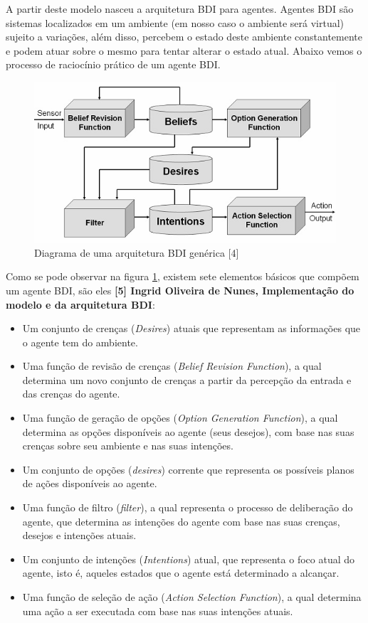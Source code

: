 A partir deste modelo nasceu a arquitetura BDI para agentes. Agentes BDI são sistemas localizados em um ambiente (em nosso caso o ambiente será virtual) sujeito a variações, além disso, percebem o estado deste ambiente constantemente e podem atuar sobre o mesmo para tentar alterar o estado atual.
Abaixo vemos o processo de raciocínio prático de um agente BDI.
 
\begin{figure}
\centering
\includegraphics{figuras/visao_BDI.jpg}
\caption{Diagrama de uma arquitetura BDI genérica [4]}
\label{arquitetura BDI}
\end{figure}

Como se pode observar na figura \ref{arquitetura BDI}, existem sete elementos básicos que compõem um agente BDI, são eles \textbf{[5] Ingrid Oliveira de Nunes, Implementação do modelo e da arquitetura BDI}:
\begin{itemize}
\item Um conjunto de crenças (\textit{Desires}) atuais que representam as informações que o agente tem do ambiente.
\item Uma função de revisão de crenças (\textit{Belief Revision Function}), a qual determina um novo conjunto de crenças a partir da percepção da entrada e das crenças do agente.
\item Uma função de geração de opções (\textit{Option Generation Function}), a qual determina as opções disponíveis ao agente (seus desejos), com base nas suas crenças sobre seu ambiente e nas suas intenções.
\item Um conjunto de opções (\textit{desires}) corrente que representa os possíveis planos de ações disponíveis ao agente.
\item Uma função de filtro (\textit{filter}), a qual representa o processo de deliberação do agente, que determina as intenções do agente com base nas suas crenças, desejos e intenções atuais.
\item Um conjunto de intenções (\textit{Intentions}) atual, que representa o foco atual do agente, isto é, aqueles estados que o agente está determinado a alcançar.
\item Uma função de seleção de ação (\textit{Action Selection Function}), a qual determina uma ação a ser executada com base nas suas intenções atuais. 
\end{itemize}

